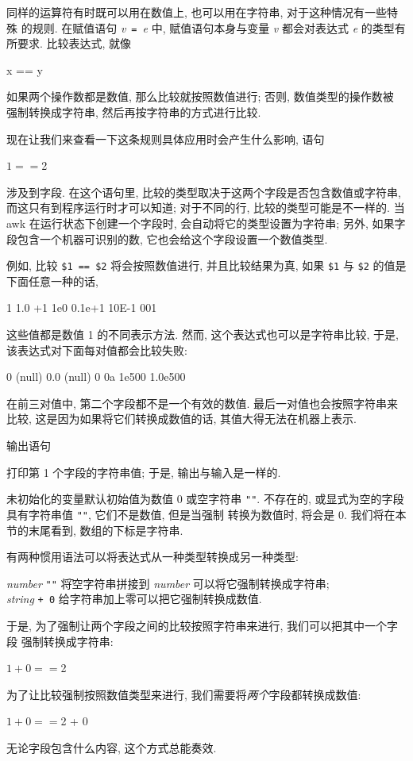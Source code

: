 同样的运算符有时既可以用在数值上, 也可以用在字符串, 对于这种情况有一些特殊
的规则. 在赋值语句 \textit{v}\ \verb'='\ \textit{e} 中, 赋值语句本身与变量
\textit{v} 都会对表达式 \textit{e} 的类型有所要求. 比较表达式, 就像
\begin{myverb}
    x == y
\end{myverb}
如果两个操作数都是数值, 那么比较就按照数值进行; 否则, 数值类型的操作数被
强制转换成字符串, 然后再按字符串的方式进行比较.

现在让我们来查看一下这条规则具体应用时会产生什么影响, 语句
\begin{myverb}
    $1 == $2
\end{myverb}
涉及到字段. 在这个语句里, 比较的类型取决于这两个字段是否包含数值或字符串,
而这只有到程序运行时才可以知道; 对于不同的行, 比较的类型可能是不一样的.
当 awk 在运行状态下创建一个字段时, 会自动将它的类型设置为字符串; 另外,
如果字段包含一个机器可识别的数, 它也会给这个字段设置一个数值类型.

例如, 比较 \verb'$1 == $2' 将会按照数值进行, 并且比较结果为真, 如果
\verb'$1' 与 \verb'$2' 的值是下面任意一种的话,
\begin{myverb}
    1   1.0    +1   1e0    0.1e+1   10E-1    001
\end{myverb}
这些值都是数值 1 的不同表示方法. 然而, 这个表达式也可以是字符串比较, 于是,
该表达式对下面每对值都会比较失败:
\begin{myverb}
    0           (null)
    0.0         (null)
    0           0a
    1e500       1.0e500
\end{myverb}
在前三对值中, 第二个字段都不是一个有效的数值.
最后一对值也会按照字符串来比较,
这是因为如果将它们转换成数值的话, 其值大得无法在机器上表示.

输出语句
打印第 1 个字段的字符串值; 于是, 输出与输入是一样的.

未初始化的变量默认初始值为数值 0 或空字符串 \verb'""'.
不存在的, 或显式为空的字段具有字符串值 \verb'""', 它们不是数值, 但是当强制
转换为数值时, 将会是 0. 我们将在本节的末尾看到, 数组的下标是字符串.

有两种惯用语法可以将表达式从一种类型转换成另一种类型:
\begin{tabbing}
    \indent\textit{number} \verb'""'  \hspace{2em} \= 将空字符串拼接到
    \textit{number} 可以将它强制转换成字符串; \\
    \indent\textit{string} \verb'+ 0'  \> 给字符串加上零可以把它强制转换成数值.
\end{tabbing}
于是, 为了强制让两个字段之间的比较按照字符串来进行, 我们可以把其中一个字段
强制转换成字符串:
\begin{myverb}
    $1 + 0 == $2
\end{myverb}
为了让比较强制按照数值类型来进行, 我们需要将\emph{两个}字段都转换成数值:
\begin{myverb}
    $1 + 0 == $2 + 0
\end{myverb}
无论字段包含什么内容, 这个方式总能奏效.


